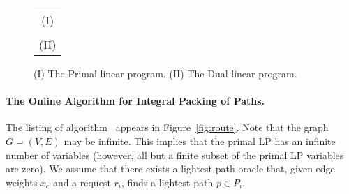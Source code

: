 \documentclass[11pt]{article}
\newcommand{\route}{\text{\sc{ipp}}}
\newcommand{\flow}{\text{\emph{flow}}}
\newenvironment{proof sketch}[1]{\noindent {\emph{Proof sketch of #1:}}}{\hfill \qed}
\begin{document}
\begin{figure}
\centering
  \begin{tabular}{c}
  \centerline{\fbox{\begin{minipage}{0.7\textwidth}
\begin{center}
        \begin{eqnarray*}
        \min\sum_{e\in E}x_{e}\cdot c(e)+\sum_{i}z_i ~~~s.t. &&\\
\forall i~\forall p\in P_{i} ~: ~~~ \sum_{e\in p}x_{e}+z_{i} && \geq 1
~~~\text{(covering const.)}
\\
x,z &&\geq 0
\end{eqnarray*}
 \end{center}
\end{minipage}}}
    \\ (I) \\
    \centerline{\fbox{\begin{minipage}{0.7\textwidth}
\begin{center}
        \begin{eqnarray*}\max \sum_{i}\sum_{p\in P_{i}} f(i,p) & s.t.\\
        \text{(demand const.)}&\forall i  & \sum_{p\in P_{i}}f(i,p)\leq 1\\
        \text{(capacity const.)}& \forall e\in E &  \flow(e) \leq c(e)\\
&&f\geq 0
\end{eqnarray*}
\end{center}
\end{minipage}}}
 \\ (II) \\
  \end{tabular}
  \caption{
(I) The Primal linear program.
(II) The Dual linear program.}
   \label{fig:LP}
\end{figure}


\paragraph{The Online Algorithm for Integral Packing of Paths.}
The listing of algorithm \route\ appears in
Figure~\ref{fig:route}.  Note that the graph $G=(V,E)$ may
be infinite.  This implies that the primal LP has an
infinite number of variables (however, all but a finite
subset of the primal LP variables are zero).  We assume
that there exists a lightest path oracle that, given edge
weights $x_e$ and a request $r_i$, finds a lightest path $p
\in P_i$.
\end{document}
